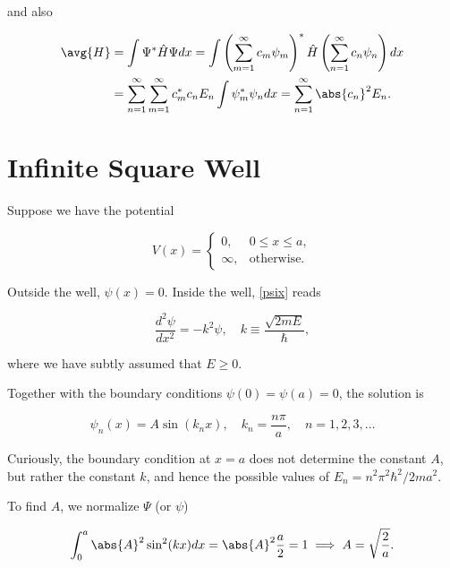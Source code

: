 \documentclass[a4paper,12pt]{report}
\begin{document}
and also 

\begin{equation}
  \begin{aligned} 
    \avg{H} &= \int \Psi ^* \hat{H} \Psi dx = \int \left( \sum_{m=1}^{\infty}c_{m}\psi _{m}   \right) ^*  \hat{H} \left( \sum_{n=1}^{\infty}c_{n}\psi _{n}    \right) dx \\ &= \sum_{n=1}^{\infty}\sum_{m=1}^{\infty}c_{m}^*c_{n}E_{n}\int \psi _{m}^*\psi _{n}dx = \sum_{n=1}^{\infty}\abs{c_{n} }^2E_{n}.          
  \end{aligned} 
\end{equation}



\section{Infinite Square Well}

Suppose we have the potential 

\begin{equation}
  V(x) =
  \begin{cases} 
  0, & 0 \leq x \leq a, \\
  \infty, & \text{otherwise}.
  \end{cases}
\end{equation}

Outside the well, \(\psi (x) = 0\). Inside the well, \cref{psix} reads 

\begin{equation}
  \frac{d^2\psi }{dx^2} = -k^2\psi , \quad  k \equiv \frac{\sqrt{2mE} }{\hbar },
\end{equation}

where we have subtly assumed that \(E \ge 0\).  

Together with the boundary conditions \(\psi (0) = \psi (a) = 0\), the solution is  

\begin{equation}
  \psi _{n} (x) = A\sin (k_{n} x), \quad k_{n} = \frac{n\pi }{a}, \quad n = 1,2,3,\ldots 
\end{equation}

Curiously, the boundary condition at \(x = a\) does not determine the constant \(A\), but rather the constant \(k\), and hence the possible values of \( E_{n} = n^2\pi ^2\hbar ^2 /2ma^2\).

To find \(A\), we normalize \(\Psi \) (or \(\psi \)) 

\begin{equation}
  \int_{0}^{a} \abs{A}^2 \sin ^2(kx) dx = \abs{A}^2 \frac{a}{2} = 1 \implies A = \sqrt{\frac{2}{a} }.      
\end{equation}
\end{document}
